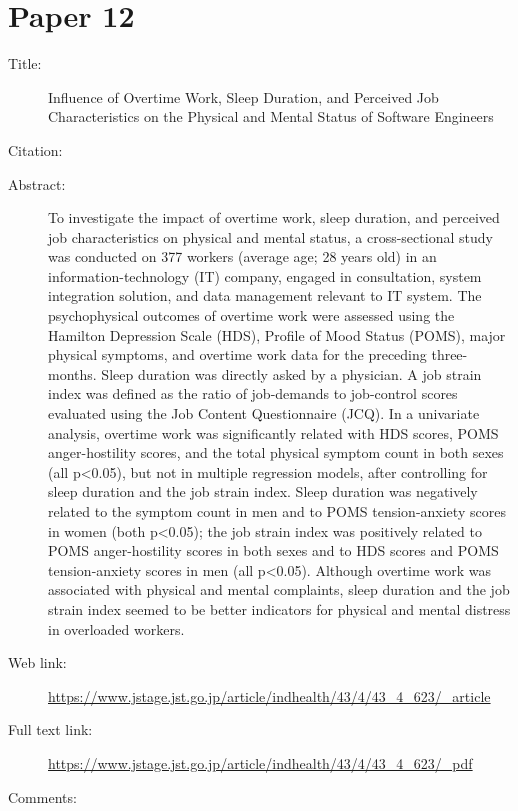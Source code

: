 \documentclass{scrartcl}
\begin{document}
\section*{Paper 12}
\begin{description}
\item[Title:] Influence of Overtime Work, Sleep Duration, and Perceived Job Characteristics on the Physical and Mental Status of Software Engineers
\item[Citation:] \cite{nishikitani2005influence}
\item[Abstract:]
To investigate the impact of overtime work, sleep duration, and perceived job characteristics on physical and mental status, a cross-sectional study was conducted on 377 workers (average age; 28 years old) in an information-technology (IT) company, engaged in consultation, system integration solution, and data management relevant to IT system. The psychophysical outcomes of overtime work were assessed using the Hamilton Depression Scale (HDS), Profile of Mood Status (POMS), major physical symptoms, and overtime work data for the preceding three-months. Sleep duration was directly asked by a physician. A job strain index was defined as the ratio of job-demands to job-control scores evaluated using the Job Content Questionnaire (JCQ). In a univariate analysis, overtime work was significantly related with HDS scores, POMS anger-hostility scores, and the total physical symptom count in both sexes (all p<0.05), but not in multiple regression models, after controlling for sleep duration and the job strain index. Sleep duration was negatively related to the symptom count in men and to POMS tension-anxiety scores in women (both p<0.05); the job strain index was positively related to POMS anger-hostility scores in both sexes and to HDS scores and POMS tension-anxiety scores in men (all p<0.05). Although overtime work was associated with physical and mental complaints, sleep duration and the job strain index seemed to be better indicators for physical and mental distress in overloaded workers.
\item[Web link:]\url  {https://www.jstage.jst.go.jp/article/indhealth/43/4/43_4_623/_article}
\item[Full text link:]\url  {https://www.jstage.jst.go.jp/article/indhealth/43/4/43_4_623/_pdf}
\item[Comments:]\cite{ weststarlegault2016}
\end{description}



\end{document}
